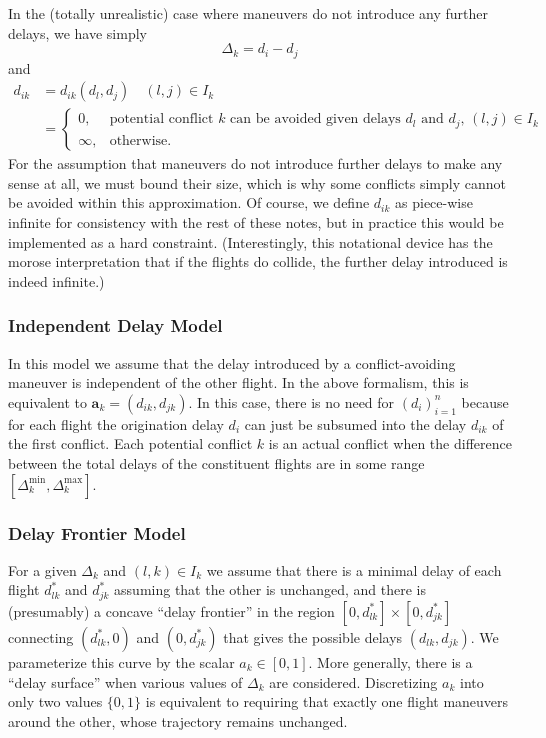 \documentclass{article}
\begin{document}
In the (totally unrealistic) case where maneuvers do not introduce any further delays, we have simply
\begin{equation*}
    \Delta_k = d_i - d_j
\end{equation*}
and 
\begin{align*}
    d_{ik} &= d_{ik}(d_l, d_j) \quad (l, j) \in I_k \\
           &= 
            \begin{cases} 
                0,      & \text{potential conflict $k$ can be avoided given delays $d_l$ and $d_j$, $(l, j) \in I_k$}\\
                \infty, & \text{otherwise}.
            \end{cases}
\end{align*}
For the assumption that maneuvers do not introduce further delays to make any sense at all, we must bound their size, which is why some conflicts simply cannot be avoided within this approximation.
Of course, we define $d_{ik}$ as piece-wise infinite for consistency with the rest of these notes, but in practice this would be implemented as a hard constraint.
(Interestingly, this notational device has the morose interpretation that if the flights do collide, the further delay introduced is indeed infinite.)

\subsubsection{Independent Delay Model}
In this model we assume that the delay introduced by a conflict-avoiding 
maneuver is independent of the other flight. 
In the above formalism, this is equivalent to $\mathbf a_k = (d_{ik}, d_{jk})$.
In this case, there is no need for $\left(d_i\right)_{i=1}^n$ because for each flight the origination delay $d_i$ can just be subsumed into the delay $d_{ik}$ of the first conflict.
Each potential conflict $k$ is an actual conflict when the difference between the total delays of the constituent flights are in some range $\left[\Delta_k^{\mathrm{min}}, \Delta_k^{\mathrm{max}}\right]$.

\subsubsection{Delay Frontier Model}
For a given $\Delta_{k}$ and $(l, k) \in I_k$ we assume that there is a minimal delay of each flight $d_{lk}^*$ and $d_{jk}^*$ assuming that the other is unchanged, and there is (presumably) a concave ``delay frontier'' in the region $[0, d_{lk}^*] \times [0, d_{jk}^*]$ connecting $(d_{lk}^*, 0)$ and $(0, d_{jk}^*)$ that gives the possible delays $(d_{lk}, d_{jk})$. 
We parameterize this curve by the scalar $a_{k} \in [0, 1]$.
More generally, there is a ``delay surface'' when various values of $\Delta_{k}$ are considered.
Discretizing $a_k$ into only two values $\{0, 1\}$ is equivalent to requiring that exactly one flight maneuvers around the other, whose trajectory remains unchanged.
\end{document}
